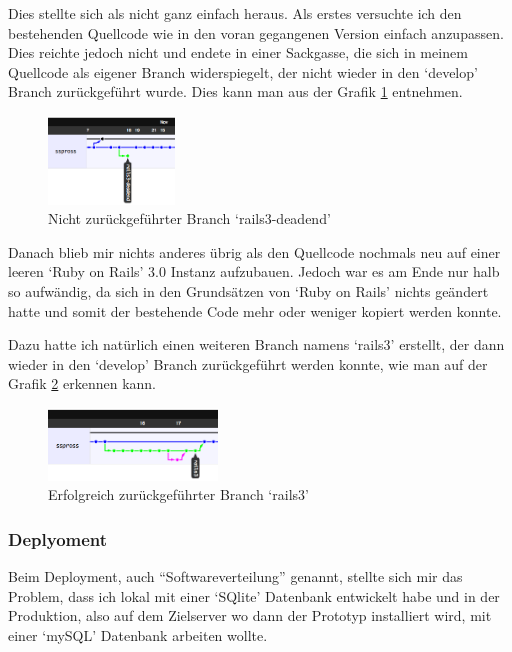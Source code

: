Dies stellte sich als nicht ganz einfach heraus. Als erstes versuchte ich
den bestehenden Quellcode wie in den voran gegangenen Version einfach anzupassen.
Dies reichte jedoch nicht und endete in einer Sackgasse, die sich in meinem
Quellcode als eigener Branch widerspiegelt, der nicht wieder in den `develop'
Branch zurückgeführt wurde. Dies kann man aus der Grafik \ref{deadend} entnehmen.

\begin{figure}[ht]
    \begin{center}
        \includegraphics[width=0.3\textwidth,angle=0]{./bilder/deadend.png}
        \caption{Nicht zurückgeführter Branch `rails3-deadend'}
        \label{deadend}
    \end{center}
\end{figure}

Danach blieb mir nichts anderes übrig als den Quellcode nochmals neu auf einer
leeren `Ruby on Rails' 3.0 Instanz aufzubauen. Jedoch war es am Ende nur halb
so aufwändig, da sich in den Grundsätzen von `Ruby on Rails' nichts geändert 
hatte und somit der bestehende Code mehr oder weniger kopiert werden konnte.

Dazu hatte ich natürlich einen weiteren Branch namens `rails3' erstellt, der
dann wieder in den `develop' Branch zurückgeführt werden konnte, wie man
auf der Grafik \ref{rails3} erkennen kann.

\begin{figure}[ht]
    \begin{center}
        \includegraphics[width=0.4\textwidth,angle=0]{./bilder/rails3.png}
        \caption{Erfolgreich zurückgeführter Branch `rails3'}
        \label{rails3}
    \end{center}
\end{figure}

\clearpage

\subsubsection{Deplyoment}
Beim Deployment, auch ``Softwareverteilung'' \cite{deployment} genannt, stellte 
sich mir das Problem, dass ich lokal mit einer `SQlite' Datenbank entwickelt habe
und in der Produktion, also auf dem Zielserver wo dann der Prototyp installiert
wird, mit einer `mySQL' Datenbank arbeiten wollte.


